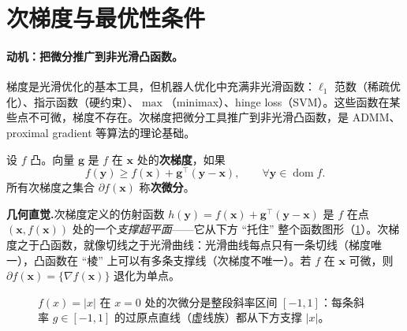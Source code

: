 \section{次梯度与最优性条件}
\label{sec:cvx-subgrad}

\paragraph{动机：把微分推广到非光滑凸函数。}
梯度是光滑优化的基本工具，但机器人优化中充满非光滑函数：$\ell_1$ 范数（稀疏优化）、指示函数（硬约束）、$\max$（minimax）、hinge loss（SVM）。这些函数在某些点不可微，梯度不存在。次梯度把微分工具推广到非光滑凸函数，是 ADMM、proximal gradient 等算法的理论基础。

\begin{definition}[次梯度与次微分]\label{def:subgradient}
设 $f$ 凸。向量 $\mathbf g$ 是 $f$ 在 $\mathbf x$ 处的\textbf{次梯度}，如果
\begin{equation}
  f(\mathbf y)\ge f(\mathbf x)+\mathbf g^\top(\mathbf y-\mathbf x),\qquad\forall\mathbf y\in\operatorname{dom}f.
  \label{eq:subgradient-def}
\end{equation}
所有次梯度之集合 $\partial f(\mathbf x)$ 称\textbf{次微分}。
\end{definition}

\noindent\textbf{几何直觉.}\;次梯度定义的仿射函数 $h(\mathbf y)=f(\mathbf x)+\mathbf g^\top(\mathbf y-\mathbf x)$ 是 $f$ 在点 $(\mathbf x,f(\mathbf x))$ 处的一个\emph{支撑超平面}——它从下方 “托住” 整个函数图形（\cref{fig:cvx-subgrad}）。次梯度之于凸函数，就像切线之于光滑曲线：光滑曲线每点只有一条切线（梯度唯一），凸函数在 “棱” 上可以有多条支撑线（次梯度不唯一）。若 $f$ 在 $\mathbf x$ 可微，则 $\partial f(\mathbf x)=\{\nabla f(\mathbf x)\}$ 退化为单点。

\begin{figure}[ht]
\centering
{}
\caption{$f(x)=|x|$ 在 $x=0$ 处的次微分是整段斜率区间 $[-1,1]$：每条斜率 $g\in[-1,1]$ 的过原点直线（虚线族）都从下方支撑 $|x|$。}
\label{fig:cvx-subgrad}
\end{figure}

